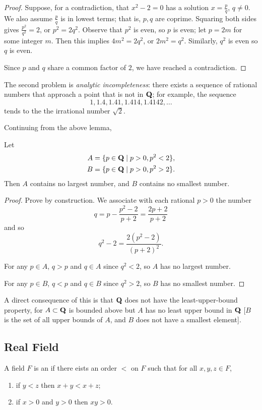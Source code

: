 \begin{proof}
Suppose, for a contradiction, that $x^2-2=0$ has a solution $x=\frac{p}{q}$, $q\neq0$. We also assume $\frac{p}{q}$ is in lowest terms; that is, $p,q$ are coprime. Squaring both sides gives $\frac{p^2}{q^2}=2$, or $p^2=2q^2$. Observe that $p^2$ is even, so $p$ is even; let $p=2m$ for some integer $m$. Then this implies $4m^2=2q^2$, or $2m^2=q^2$. Similarly, $q^2$ is even so $q$ is even.

Since $p$ and $q$ share a common factor of $2$, we have reached a contradiction.
\end{proof}

The second problem is \emph{analytic incompleteness}: there exists a sequence of rational numbers that approach a point that is not in $\mathbf Q$; for example, the sequence
\[1,1.4,1.41,1.414,1.4142,\dots\]
tends to the the irrational number $\sqrt{2}$.

Continuing from the above lemma,
\begin{lemma}
Let
\begin{align*}
A&=\{p\in\mathbf Q\mid p>0,p^2<2\},\\
B&=\{p\in\mathbf Q\mid p>0,p^2>2\}.
\end{align*}
Then $A$ contains no largest number, and $B$ contains no smallest number.
\end{lemma}

\begin{proof}
Prove by construction. We associate with each rational $p>0$ the number
\[q=p-\frac{p^2-2}{p+2}=\frac{2p+2}{p+2}\]
and so
\[q^2-2=\frac{2(p^2-2)}{(p+2)^2}.\]

For any $p\in A$, $q>p$ and $q\in A$ since $q^2<2$, so $A$ has no largest number.

For any $p\in B$, $q<p$ and $q\in B$ since $q^2>2$, so $B$ has no smallest number.
\end{proof}

A direct consequence of this is that $\mathbf Q$ does not have the least-upper-bound property, for $A\subset\mathbf Q$ is bounded above but $A$ has no least upper bound in $\mathbf Q$ [$B$ is the set of all upper bounds of $A$, and $B$ does not have a smallest element].

\subsection{Real Field}
\begin{definition}
A field $F$ is an  if there eists an order $<$ on $F$ such that for all $x,y,z\in F$,
\begin{enumerate}[label=(\roman*)]
\item if $y<z$ then $x+y<x+z$;
\item if $x>0$ and $y>0$ then $xy>0$.
\end{enumerate}
\end{definition}

